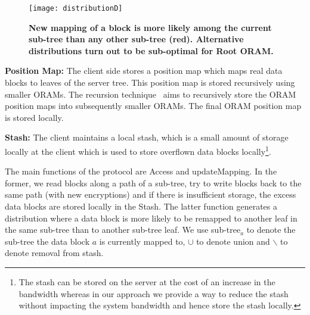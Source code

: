\documentclass[USenglish,oneside,twocolumn]{article}
\makeatletter
\newcommand{\ourprotocol}{Root ORAM}
\let\origsubsection\subsection
\renewcommand\subsection{\@ifstar{\starsubsection}{\nostarsubsection}}
\newcommand\nostarsubsection[1]
{\subsectionprelude\origsubsection{#1}\subsectionpostlude}
\newcommand\starsubsection[1]
{\subsectionprelude\origsubsection*{#1}\subsectionpostlude}
\newcommand\subsectionprelude{\vspace{-1.5em}}
\newcommand\subsectionpostlude{\vspace{-1em}}
\makeatother
\begin{document}
\begin{figure}
\centering
\texttt{[image: distributionD]}
\vspace{-5pt}
\caption{\textbf{New mapping of a block is more likely among the current sub-tree than any other sub-tree (red). Alternative distributions turn out to be sub-optimal for \ourprotocol{}.}}
\label{fig:distributionD}
\end{figure}


\subsection{Client Storage}
\textbf{Position Map: }The client side stores a position map which maps real data blocks to leaves of the server tree. This position map is stored recursively using smaller ORAMs. The recursion technique~\cite{tree_based_orams, SSSoram, pathoram} aims to recursively store the ORAM position maps into subsequently smaller ORAMs. The final ORAM position map is stored locally.


\textbf{Stash: }The client maintains a local stash, which is a small amount of storage locally at the client which is used to store overflown data blocks locally\footnote{The stash can be stored on the server at the cost of an increase in the bandwidth whereas in our approach we provide a way to reduce the stash without impacting the system bandwidth and hence store the stash locally.}.\vspace{5mm}


\subsection{Protocol Details}
The main functions of the protocol are Access and updateMapping. 
In the former, we read blocks along a path of a sub-tree, try to write blocks back to the same path (with new encryptions) and if there is insufficient storage, the excess data blocks are stored locally in the Stash. The latter function generates a distribution where a data block is more likely to be remapped to another leaf in the same sub-tree than to another sub-tree leaf. We use sub-tree$_a$ to denote the sub-tree the data block $a$ is currently mapped to, $\cup$ to denote union and $\backslash$ to denote removal from stash.

\vspace{2mm}
\noindent{}\vspace{2mm}
\end{document}
